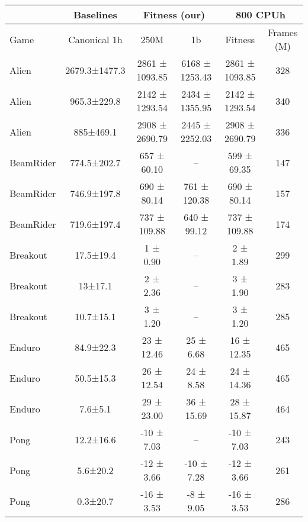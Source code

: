 \begin{table}[H]
\begin{small}
\begin{center}
\begin{tabular}{l|c|cc|cc|}

        & \multicolumn{1}{c|}{Baselines} & \multicolumn{2}{c|}{Fitness (our)} & \multicolumn{2}{c}{800 CPUh} \\
\hline
                Game &  Canonical 1h &           250M &             1b &        Fitness &  Frames (M) \\
\hline
\hline
        Alien & 2679.3±1477.3 & 2861 ± 1093.85 & 6168 ± 1253.43 & 2861 ± 1093.85 &         328 \\
        Alien &   965.3±229.8 & 2142 ± 1293.54 & 2434 ± 1355.95 & 2142 ± 1293.54 &         340 \\
        Alien &     885±469.1 & 2908 ± 2690.79 & 2445 ± 2252.03 & 2908 ± 2690.79 &         336 \\
\hline
        BeamRider &   774.5±202.7 &    657 ± 60.10 &             -- &    599 ± 69.35 &         147 \\
        BeamRider &   746.9±197.8 &    690 ± 80.14 &   761 ± 120.38 &    690 ± 80.14 &         157 \\
        BeamRider &   719.6±197.4 &   737 ± 109.88 &    640 ± 99.12 &   737 ± 109.88 &         174 \\
\hline
        Breakout &     17.5±19.4 &       1 ± 0.90 &             -- &       2 ± 1.89 &         299 \\
        Breakout &       13±17.1 &       2 ± 2.36 &             -- &       3 ± 1.90 &         283 \\
        Breakout &     10.7±15.1 &       3 ± 1.20 &             -- &       3 ± 1.20 &         285 \\
\hline
        Enduro &     84.9±22.3 &     23 ± 12.46 &      25 ± 6.68 &     16 ± 12.35 &         465 \\
        Enduro &     50.5±15.3 &     26 ± 12.54 &      24 ± 8.58 &     24 ± 14.36 &         465 \\
        Enduro &       7.6±5.1 &     29 ± 23.00 &     36 ± 15.69 &     28 ± 15.87 &         464 \\
\hline
        Pong &     12.2±16.6 &     -10 ± 7.03 &             -- &     -10 ± 7.03 &         243 \\
        Pong &      5.6±20.2 &     -12 ± 3.66 &     -10 ± 7.28 &     -12 ± 3.66 &         261 \\
        Pong &      0.3±20.7 &     -16 ± 3.53 &      -8 ± 9.05 &     -16 ± 3.53 &         286 \\

\end{tabular}
\end{center}
\end{small}
\end{table}
